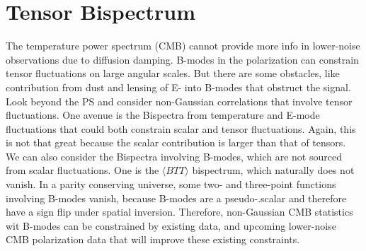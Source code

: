 \documentclass[12pt]{article}
\begin{document}
\section{Tensor Bispectrum}
The temperature power spectrum (CMB) cannot provide more info in lower-noise observations due to diffusion damping. B-modes in the polarization can constrain tensor fluctuations on large angular scales. But there are some obstacles, like contribution from dust and lensing of E- into B-modes that obstruct the signal. Look beyond the PS and consider non-Gaussian correlations that involve tensor fluctuations. One avenue is the Bispectra from temperature and E-mode fluctuations that could both constrain scalar and tensor fluctuations. Again, this is not that great because the scalar contribution is larger than that of tensors. We can also consider the Bispectra involving B-modes, which are not sourced from scalar fluctuations. One is the $\langle BTT \rangle$ bispectrum, which naturally does not vanish. In a parity conserving universe, some two- and three-point functions involving B-modes vanish, because B-modes are a pseudo-.scalar and therefore have a sign flip under spatial inversion. Therefore, non-Gaussian CMB statistics wit B-modes can be constrained by existing data, and upcoming lower-noise CMB polarization data that will improve these existing constraints. 
\end{document}

